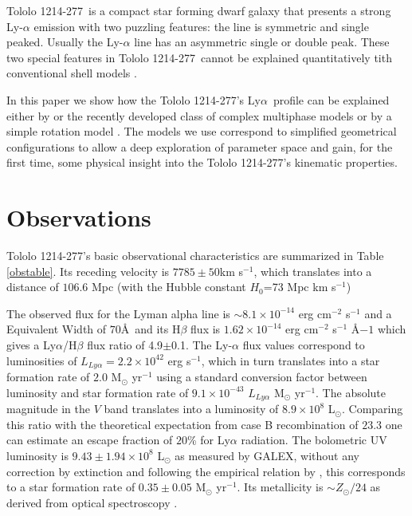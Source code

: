 \documentclass[a4,useAMS,usenatbib,usegraphicx]{mn2e}
\newcommand{\tol}{Tololo 1214-277}
\newcommand{\lya}{Ly$\alpha$}
\begin{document}
\tol\ is a compact star forming dwarf galaxy that presents a
strong Ly-$\alpha$ emission \citep{Thuan97} with two puzzling 
features: the line is symmetric and single peaked.
Usually the Ly-$\alpha$ line has an asymmetric single or double peak. 
These two special features in \tol\ cannot be explained quantitatively
tith conventional shell models
\citep{Mas-Hesse09,2015A&A...578A...7V,2015ApJ...812..123G}.   

In this paper we show how the \tol's \lya\ profile can be explained
either by  or the recently developed class of complex multiphase models 
\citep{Gronke2016} or by a simple rotation model
\citep{GaravitoCamargo2014}. 
The models we use correspond to simplified geometrical configurations
to allow a deep exploration of parameter space and gain, for the first time,
some physical insight into the \tol's kinematic properties.



\section{Observations}
\tol's basic observational characteristics are summarized in Table \ref{obstable}.
Its receding velocity is $7785\pm 50$km s$^{-1}$, which translates
into a distance of $106.6$ Mpc (with the Hubble constant $H_{0}$=73
Mpc km s$^{-1}$) 



The observed flux for the Lyman alpha line is $\sim
8.1\times 10^{-14}$ erg cm$^{-2}$ s$^{-1}$ \citep{Thuan97}
and a Equivalent Width of $70$\AA\ and its H$\beta$ flux is 
$1.62\times 10^{-14}$ erg cm$^{-2}$ s$^{-1}$ \AA${-1}$
\citep{Izotov04} which gives a Ly$\alpha$/H$\beta$ flux ratio of
4.9$\pm$0.1.
The Ly-$\alpha$ flux values correspond to luminosities of
$L_{Ly\alpha}=2.2\times 10^{42}$ erg s$^{-1}$, which in turn
translates  into a star formation rate of $2.0$ M$_{\odot}$ yr$^{-1}$
using a standard conversion factor between luminosity and star
formation rate of $9.1\times 10^{-43}$ $L_{Ly\alpha}$ M$_{\odot}$ yr$^{-1}$. 
The absolute magnitude in the $V$ band translates into a luminosity of
$8.9\times 10^{8}$ L$_{\odot}$.
Comparing this ratio with the theoretical expectation from case B
recombination of $23.3$ \citep{Hummer1987} one can estimate an escape
fraction of $20$\% for Ly$\alpha$ radiation.
The bolometric UV luminosity is $9.43\pm1.94 \times 10^{8}$
L$_{\odot}$ as measured by GALEX, without any correction by extinction
and following the empirical relation by \cite{Kennicutt98}, this
corresponds to a star formation rate of $0.35\pm 0.05$ M$_{\odot}$
yr$^{-1}$. Its metallicity is $\sim Z_{\odot}/24$ as derived from
optical spectroscopy \citep{Izotov04}. 
\end{document}
